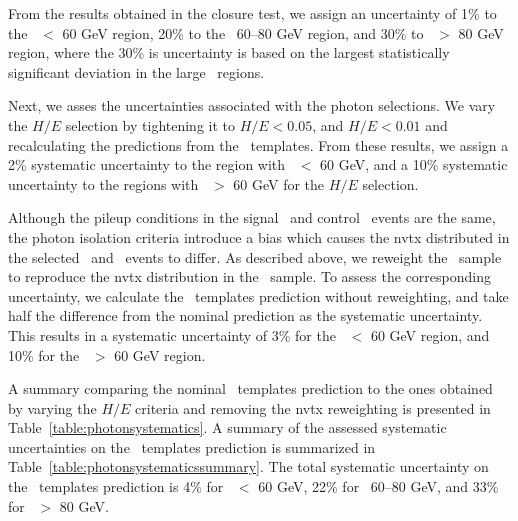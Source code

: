 From the results obtained in the closure test, we assign an uncertainty of 1\% to the \MET\ $<$ 60 GeV region, 20\% to the \MET\ 60--80 GeV region,
and  30\% to \MET\ $>$ 80 GeV region, where the 30\% is uncertainty is based on the largest statistically significant deviation in the large \MET\ regions.

Next, we asses the uncertainties associated with the photon selections. We vary the $H/E$ selection by tightening it to $H/E < 0.05$, 
and $H/E < 0.01$ and recalculating the predictions from the \MET\ templates. 
From these results, we assign a 2\% systematic uncertainty to the region with \MET\ $<$ 60 GeV, and a 10\% systematic uncertainty 
to the regions with \MET\ $>$ 60 GeV for the $H/E$ selection. 

Although the pileup conditions in the signal \zjets\ and control \gjets\ events are the same, the photon isolation criteria introduce a bias
which causes the nvtx distributed in the selected \zjets\ and \gjets\ events to differ. As described above, we reweight the \gjets\ sample
to reproduce the nvtx distribution in the \zjets\ sample. To assess the corresponding uncertainty, we calculate the \MET\ templates prediction
without reweighting, and take half the difference from the nominal prediction as the systematic uncertainty. This results in a systematic
uncertainty of 3\% for the \MET\ $<$ 60 GeV region, and 10\% for the \MET\ $>$ 60 GeV region.

A summary comparing the nominal \MET\ templates prediction to the ones obtained by varying the $H/E$ criteria and removing the nvtx reweighting
is presented in Table~\ref{table:photonsystematics}. A summary of the assessed systematic uncertainties on the \MET\ templates prediction
is summarized in Table~\ref{table:photonsystematicssummary}. The total systematic uncertainty on the \MET\ templates prediction is
4\% for \MET\ $<$ 60 GeV, 22\% for \MET\ 60--80 GeV, and 33\% for \MET\ $>$ 80 GeV.


